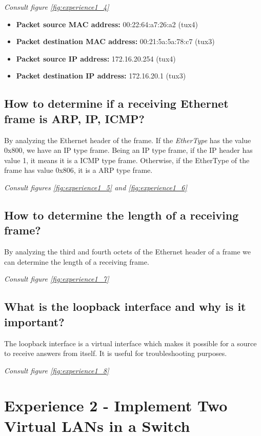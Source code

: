\documentclass[11pt]{report}
\begin{document}
\textit{Consult figure \ref{fig:experience1_4}}

\begin{itemize}
    \item \textbf{Packet source MAC address:} 00:22:64:a7:26:a2 (tux4)
    \item \textbf{Packet destination MAC address:}  00:21:5a:5a:78:c7 (tux3)
    \item \textbf{Packet source IP address:} 172.16.20.254 (tux4)
    \item \textbf{Packet destination IP address:} 172.16.20.1 (tux3)
\end{itemize}

\subsection{How to determine if a receiving Ethernet frame is ARP, IP, ICMP?}

By analyzing the Ethernet header of the frame. If the \textit{EtherType} has the value 0x800, we have an IP type frame. Being an IP type frame, if the IP header has value 1, it means it is a ICMP type frame. Otherwise, if the EtherType of the frame has value 0x806, it is a ARP type frame.

\textit{Consult figures \ref{fig:experience1_5} and \ref{fig:experience1_6}}

\subsection{How to determine the length of a receiving frame?}

By analyzing the third and fourth octets of the Ethernet header of a frame we can determine the length of a receiving frame.

\textit{Consult figure \ref{fig:experience1_7}}

\subsection{What is the loopback interface and why is it important?}

The loopback interface is a virtual interface which makes it possible for a source to receive answers from itself. It is useful for troubleshooting purposes.

\textit{Consult figure \ref{fig:experience1_8}}

\newpage

\section{Experience 2 - Implement Two Virtual LANs in a Switch}
\end{document}
